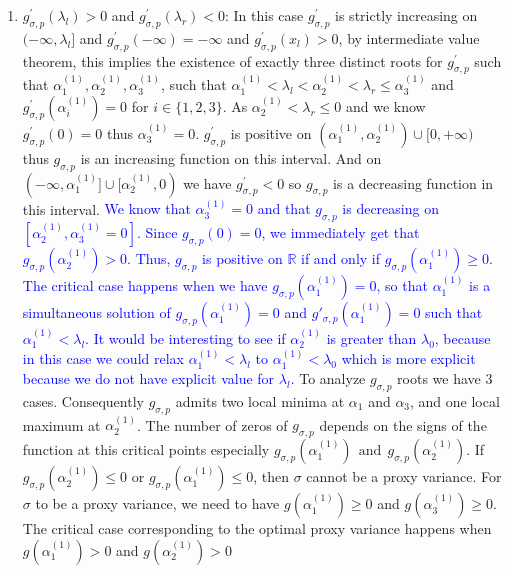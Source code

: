 \documentclass[a4paper, 10pt]{article}
\theoremstyle{definition}
\begin{document}
\begin{itemize}
\begin{itemize}
\begin{enumerate}
            \item  $g^{'}_{\sigma,p}(\lambda_l)>0$ and $g^{'}_{\sigma,p}(\lambda_r) < 0$: In this case $g^{'}_{\sigma, p}$ is strictly increasing on $(-\infty, \lambda_l]$ and $g^{'}_{\sigma,p}(-\infty)=-\infty$ and $g^{'}_{\sigma,p}(x_l)>0$,  by intermediate value theorem, this implies the existence of exactly three distinct roots for $g^{'}_{\sigma, p}$ such that $\alpha_1^{(1)}, \alpha_2^{(1)}, \alpha_3^{(1)}$, such that $\alpha_1^{(1)} < \lambda_l < \alpha_2^{(1)} < \lambda_r \leq \alpha_3^{(1)}$ and $g^{'}_{\sigma, p}(\alpha_i^{(1)})=0$ for $i\in \{1,2,3\}$. As $\alpha_2^{(1)} <\lambda_r \leq 0$ and we know $g^{'}_{\sigma, p}(0)=0$ thus $\alpha_3^{(1)}=0$. $g^{'}_{\sigma, p}$ is  positive on $(\alpha_1^{(1)},  \alpha_2^{(1)})\cup [0, +\infty)$ thus  $g_{\sigma, p}$ is an increasing  function on this interval. And on  $(-\infty, \alpha_1^{(1)}]\cup [\alpha_2^{(1)}, 0)$ we have $g^{'}_{\sigma, p}<0$ so $g_{\sigma, p}$ is a decreasing  function in this interval. \textcolor{blue}{We know that $\alpha_3^{(1)}=0$ and that $g_{\sigma,p}$ is decreasing on $[\alpha_2^{(1)},\alpha_3^{(1)}=0]$. Since $g_{\sigma,p}(0)=0$, we immediately get that $g_{\sigma,p}(\alpha_2^{(1)})>0$. Thus, $g_{\sigma,p}$ is positive on $\mathbb{R}$ if and only if $g_{\sigma,p}(\alpha_1^{(1)})\geq0$. The critical case happens when  we have $g_{\sigma,p}(\alpha_1^{(1)})=0$, so that $\alpha_1^{(1)}$ is a simultaneous solution of $g_{\sigma,p}(\alpha_1^{(1)})=0$ and $g'_{\sigma,p}(\alpha_1^{(1)})=0$ such that $\alpha_1^{(1)}<\lambda_l$. It would be interesting to see if $\alpha_2^{(1)}$ is greater than $\lambda_0$, because in this case we could relax $\alpha_1^{(1)}<\lambda_l$ to $\alpha_1^{(1)}<\lambda_0$ which is more explicit because we do not have explicit value for $\lambda_l$. } To analyze $g_{\sigma, p}$ roots we have 3 cases. Consequently $g_{\sigma, p}$ admits two local minima at $\alpha_1$ and $\alpha_3$, and one local maximum at $\alpha_2^{(1)}$. The number of zeros of $g_{\sigma, p}$ depends on the signs of the function at this critical points especially $g_{\sigma, p}(\alpha_1^{(1)}) \ \ \text{and} \ \ g_{\sigma, p}(\alpha_2^{(1)})$. If $g_{\sigma, p}(\alpha_2^{(1)}) \leq  0$ or  $g_{\sigma, p}(\alpha_1^{(1)}) \leq 0$, then $\sigma$ cannot be a proxy variance. For $\sigma$ to be a proxy variance, we need to have  $g(\alpha_1^{(1)})\geq 0$ and $g(\alpha_3^{(1)})\geq 0$. The critical case corresponding to the optimal proxy variance happens when $g(\alpha_1^{(1)})>0$ and $g(\alpha_2^{(1)}) > 0$
            

\end{enumerate}
\end{itemize}
\end{itemize}
\end{document}
